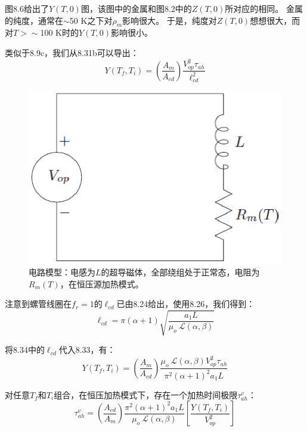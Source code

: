 图8.6给出了$Y(T,0)$图，该图中的金属和图8.2中的$Z(T,0)$所对应的相同。
金属的纯度，通常在$\sim$50 K之下对$\rho_m$影响很大。
于是，纯度对$Z(T,0)$想想很大，而对$T>\sim$100 K时的$Y(T,0)$影响很小。

类似于8.9c，我们从8.31b可以导出：
\begin{equation}%
Y(T_f,T_i)=\left(\frac{A_m}{A_{cd}}\right)\frac{V_{op}^{2}\tau_{ah}}{\ell_{cd}^{2}}
\end{equation}
\begin{figure}
	\centering
	\includegraphics[scale=0.5]{chpt8/figs/fig8.5.eps}
	\caption{电路模型：电感为$L$的超导磁体，全部绕组处于正常态，电阻为$R_m(T)$，在恒压源加热模式。}
\end{figure}

注意到螺管线圈在$f_r=1$的$\ell_{cd}$已由8.24给出，使用8.26，我们得到：
\begin{equation}%
\ell_{cd}=\pi(\alpha+1)\sqrt{\frac{a_1L}{\mu_o\ \mathcal{L}(\alpha,\beta)}}
\end{equation}

将8.34中的$\ell_{cd}$代入8.33，有：
\begin{equation}%
Y(T_f,T_i)=\left(\frac{A_m}{A_{cd}}\right)\frac{\mu_o\ \mathcal{L}(\alpha,\beta)V_{op}^{2}\tau_{ah}}{\pi^2(\alpha+1)^2a_1L}
\end{equation}

对任意$T_f$和$T_i$组合，在恒压加热模式下，存在一个加热时间极限$\tau_{ah}^v$：
\begin{equation}%
\tau_{ah}^{\upsilon}=\left(\frac{A_{cd}}{A_m}\right)\frac{\pi^2(\alpha+1)^2a_1L}{\mu_o\ \mathcal{L}(\alpha,\beta)}\left[\frac{Y(T_f,T_i)}{V_{op}^{2}}\right]
\end{equation}

